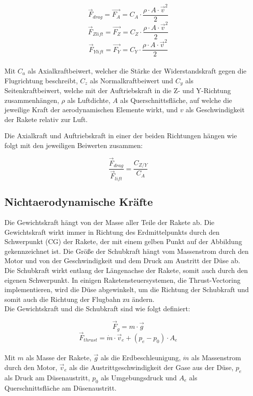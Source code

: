 \begin{equation}
    \vec{F}_{drag} = \vec{F_A} = C_A \cdot \frac{\rho \cdot A \cdot \vec{v}^{2}}{2}
\end{equation}
\begin{equation}
    \vec{F}_{Z lift} = \vec{F_Z} = C_Z \cdot \frac{\rho \cdot A \cdot \vec{v}^{2}}{2}
\end{equation}
\begin{equation}
    \vec{F}_{Y lift} = \vec{F_Y} = C_Y \cdot \frac{\rho \cdot A \cdot \vec{v}^{2}}{2}
\end{equation}
\\Mit $C_a$ als Axialkraftbeiwert, welcher die Stärke der Widerstandskraft gegen die Flugrichtung beschreibt, $C_z$ als Normalkraftbeiwert und $C_y$ als Seitenkraftbeiwert, welche mit der Auftriebskraft in die Z- und Y-Richtung zusammenhängen, $\rho$ als Luftdichte, $A$ als Querschnittsfläche, auf welche die jeweilige Kraft der aerodynamischen Elemente wirkt, und $v$ als Geschwindigkeit der Rakete relativ zur Luft.

Die Axialkraft und Auftriebskraft in einer der beiden Richtungen hängen wie folgt mit den jeweiligen Beiwerten zusammen:

\begin{equation}
    \frac{\vec{F}_{drag}}{\vec{F}_{lift}} = \frac{C_{Z/Y}}{C_A}
\end{equation}

\subsection{Nichtaerodynamische Kräfte}
\label{subsec:not_aero_forces}
Die Gewichtskraft hängt von der Masse aller Teile der Rakete ab. Die Gewichtskraft wirkt immer in Richtung des Erdmittelpunkts durch den Schwerpunkt (CG) der Rakete, der mit einem gelben Punkt auf der Abbildung gekennzeichnet ist. Die Größe der Schubkraft hängt vom Massenstrom durch den Motor und von der Geschwindigkeit und dem Druck am Austritt der Düse ab. Die Schubkraft wirkt entlang der Längenachse der Rakete, somit auch durch den eigenen Schwerpunkt. In einigen Raketensteuersystemen, die Thrust-Vectoring implementieren, wird die Düse abgewinkelt, um die Richtung der Schubkraft und somit auch die Richtung der Flugbahn zu ändern. \cite{BeginnersGuideToAeronautics} \\
Die Gewichtskraft und die Schubkraft sind wie folgt definiert:

\begin{equation}
    \vec{F}_{g} = m \cdot \vec{g}
\end{equation}
\begin{equation}
    \vec{F}_{thrust} = \dot{m} \cdot \vec{v}_{e} + (p_e - p_0) \cdot A_e
    \label{eq:rocket_thrust}
\end{equation}
\\Mit $m$ als Masse der Rakete, $\vec{g}$ als die Erdbeschleunigung, $\dot{m}$ als Massenstrom durch den Motor, $\vec{v}_{e}$ als die Austrittgeschwindigkeit der Gase aus der Düse, $p_e$ als Druck am Düsenaustritt, $p_0$ als Umgebungsdruck und $A_e$ als Querschnittsfläche am Düsenaustritt.

